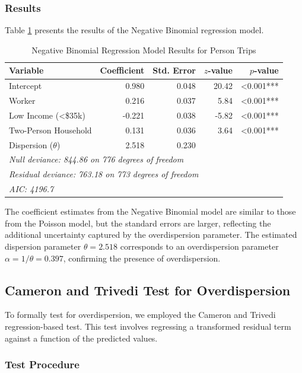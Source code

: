 \documentclass[12pt]{article}
\begin{document}
\subsubsection{Results}

Table \ref{tab:nb_results} presents the results of the Negative Binomial regression model.

\begin{table}[h]
\centering
\caption{Negative Binomial Regression Model Results for Person Trips}
\label{tab:nb_results}
\begin{tabular}{lrrrr}
\toprule
Variable & Coefficient & Std. Error & $z$-value & $p$-value \\
\midrule
Intercept & 0.980 & 0.048 & 20.42 & <0.001*** \\
Worker & 0.216 & 0.037 & 5.84 & <0.001*** \\
Low Income (<\$35k) & -0.221 & 0.038 & -5.82 & <0.001*** \\
Two-Person Household & 0.131 & 0.036 & 3.64 & <0.001*** \\
\midrule
Dispersion ($\theta$) & 2.518 & 0.230 & & \\
\bottomrule
\multicolumn{5}{l}{\textit{Null deviance: 844.86 on 776 degrees of freedom}} \\
\multicolumn{5}{l}{\textit{Residual deviance: 763.18 on 773 degrees of freedom}} \\
\multicolumn{5}{l}{\textit{AIC: 4196.7}}
\end{tabular}
\end{table}

The coefficient estimates from the Negative Binomial model are similar to those from the Poisson model, but the standard errors are larger, reflecting the additional uncertainty captured by the overdispersion parameter. The estimated dispersion parameter $\theta = 2.518$ corresponds to an overdispersion parameter $\alpha = 1/\theta = 0.397$, confirming the presence of overdispersion.

\subsection{Cameron and Trivedi Test for Overdispersion}

To formally test for overdispersion, we employed the Cameron and Trivedi regression-based test. This test involves regressing a transformed residual term against a function of the predicted values.

\subsubsection{Test Procedure}
\end{document}
